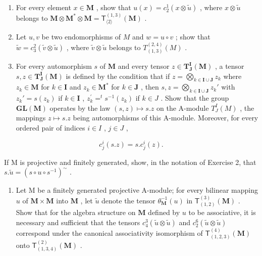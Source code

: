\begin{enumerate}
\def\labelenumi{(\alph{enumi})}
\item
  For every element \(x \in \mathbf{M}\) , show that \(u(x) = c_2^1(x \otimes \tilde{u})\) , where \(x \otimes \tilde{u}\) belongs to \(\mathbf{M} \otimes \mathbf{M}^* \otimes \mathbf{M} = \mathsf{T}_{\langle 2\rangle}^{(1,3)}(\mathbf{M})\) .
\item
  Let \(u, v\) be two endomorphisms of \(M\) and \(w = u \circ v\) ; show that \(\tilde{w} = c_3^2(\tilde{v} \otimes \tilde{u})\) , where \(\tilde{v} \otimes \tilde{u}\) belongs to \(T_{(1,3)}^{(2,4)}(M)\) .
\item
  For every automorphism \(s\) of \(\mathbf{M}\) and every tensor \(z \in \mathbf{T}_{\mathbf{J}}^{\mathbf{I}}(\mathbf{M})\) , a tensor \(s, z \in \mathbf{T}_{\mathbf{J}}^{\mathbf{I}}(\mathbf{M})\) is defined by the condition that if \(z = \bigotimes_{k \in \mathbf{I} \cup \mathbf{J}} z_k\) where \(z_k \in \mathbf{M}\) for \(k \in \mathbf{I}\) and \(z_k \in \mathbf{M}^*\) for \(k \in \mathbf{J}\) , then \(s, z = \bigotimes_{k \in \mathbf{I} \cup \mathbf{J}} z_k'\) with \(z_k' = s(z_k)\) if \(k \in \mathbf{I}\) , \(z_{k}^{\prime}=^{t}s^{-1}(z_{k})\) if \(k\in J\) . Show that the group \(\mathbf{GL}(\mathbf{M})\) operates by the law \((s,z)\mapsto s.z\) on the A-module \(T_{J}^{I}(M)\) , the mappings \(z\mapsto s.z\) being automorphisms of this A-module. Moreover, for every ordered pair of indices \(i\in I\) , \(j\in J\) ,
\end{enumerate}

\[
c _ {j} ^ {i} (s. z) = s. c _ {j} ^ {i} (z).
\]

If M is projective and finitely generated, show, in the notation of Exercise 2, that \(s. \tilde{u} = (s \circ u \circ s^{-1})^{\sim}\) .

\begin{enumerate}
\def\labelenumi{\arabic{enumi}.}
\setcounter{enumi}{3}
\tightlist
\item
  Let M be a finitely generated projective A-module; for every bilinear mapping \(u\) of \(\mathbf{M} \times \mathbf{M}\) into \(\mathbf{M}\) , let \(\tilde{u}\) denote the tensor \(\theta_{\mathbf{M}}^{-1}(u)\) in \(\mathsf{T}_{(1,2)}^{(3)}(\mathbf{M})\) . Show that for the algebra structure on \(\mathbf{M}\) defined by \(u\) to be associative, it is necessary and sufficient that the tensors \(c_4^3 (\tilde{u} \otimes \tilde{u})\) and \(c_2^6 (\tilde{u} \otimes \tilde{u})\) correspond under the canonical associativity isomorphism of \(\mathsf{T}_{(1,2,3)}^{(4)}(\mathbf{M})\) onto \(\mathsf{T}_{(1,3,4)}^{(2)}(\mathbf{M})\) .
\end{enumerate}


